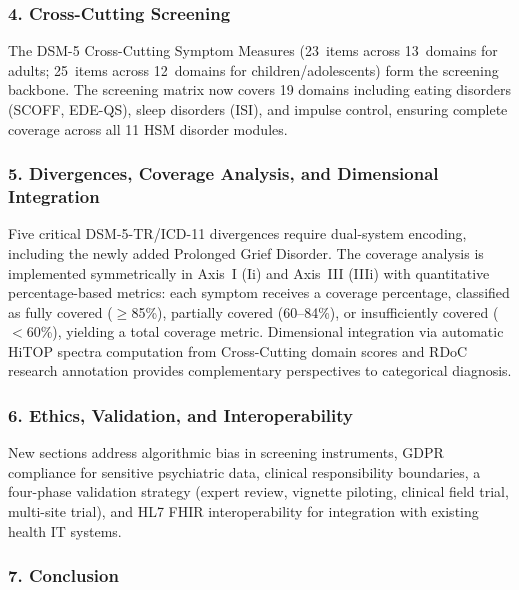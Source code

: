 \documentclass[11pt,a4paper]{article}
\begin{document}
\subsubsection*{4. Cross-Cutting Screening}

The DSM-5 Cross-Cutting Symptom Measures (23~items across 13~domains for adults; 25~items across 12~domains for children/adolescents) form the screening backbone. The screening matrix now covers 19 domains including eating disorders (SCOFF, EDE-QS), sleep disorders (ISI), and impulse control, ensuring complete coverage across all 11 HSM disorder modules.

\subsubsection*{5. Divergences, Coverage Analysis, and Dimensional Integration}

Five critical DSM-5-TR/ICD-11 divergences require dual-system encoding, including the newly added Prolonged Grief Disorder. The coverage analysis is implemented symmetrically in Axis~I (Ii) and Axis~III (IIIi) with quantitative percentage-based metrics: each symptom receives a coverage percentage, classified as fully covered ($\geq$85\%), partially covered (60--84\%), or insufficiently covered ($<$60\%), yielding a total coverage metric. Dimensional integration via automatic HiTOP spectra computation from Cross-Cutting domain scores and RDoC research annotation provides complementary perspectives to categorical diagnosis.

\subsubsection*{6. Ethics, Validation, and Interoperability}

New sections address algorithmic bias in screening instruments, GDPR compliance for sensitive psychiatric data, clinical responsibility boundaries, a four-phase validation strategy (expert review, vignette piloting, clinical field trial, multi-site trial), and HL7 FHIR interoperability for integration with existing health IT systems.

\subsubsection*{7. Conclusion}
\end{document}
